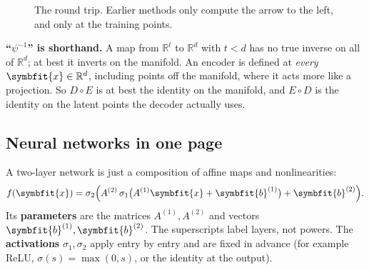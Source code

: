 \documentclass[11pt]{article}
\newcommand{\bm}[1]{\symbfit{#1}}
\newcommand{\R}{\mathbb{R}}
\newcommand{\vx}{\bm{x}}
\begin{document}
\begin{figure}[htbp]
\centering
{}
\caption{The round trip. Earlier methods only compute the arrow to the left, and only at the training points.}
\label{fig:aeroundtrip}
\end{figure}

\begin{careful}
\textbf{``$\psi^{-1}$'' is shorthand.} A map from $\R^t$ to $\R^d$ with $t<d$ has no true inverse on all of $\R^d$; at best it inverts on the manifold. An encoder is defined at \emph{every} $\vx\in\R^d$, including points off the manifold, where it acts more like a projection. So $D\circ E$ is at best the identity on the manifold, and $E\circ D$ is the identity on the latent points the decoder actually uses.
\end{careful}

\subsection{Neural networks in one page}

A two-layer network is just a composition of affine maps and nonlinearities:
\[
f(\vx)=\sigma_2\Big(A^{(2)}\,\sigma_1\big(A^{(1)}\vx+\bm b^{(1)}\big)+\bm b^{(2)}\Big).
\]
Its \textbf{parameters} are the matrices $A^{(1)},A^{(2)}$ and vectors $\bm b^{(1)},\bm b^{(2)}$. The superscripts label layers, not powers. The \textbf{activations} $\sigma_1,\sigma_2$ apply entry by entry and are fixed in advance (for example ReLU, $\sigma(s)=\max(0,s)$, or the identity at the output).
\end{document}
